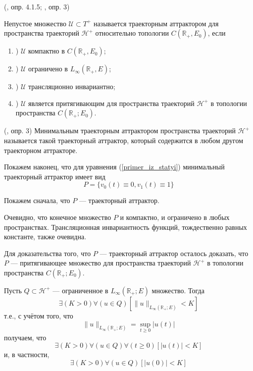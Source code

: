 \opred (\cite{Zelenaya}, опр. 4.1.5; \cite{zhidkosti_s_pamyatyu}, опр. 3)

Непустое множество $\mathcal{U}\subset T^+$
называется траекторным аттрактором для пространства траекторий $\mathcal{H}^+$
относительно топологии $C(\mathbb{R}_+,E_0)$, если
\begin{enumerate}
	\item)
		$\mathcal{U}$ компактно в $C(\mathbb{R}_+,E_0)$;
	\item)
		$\mathcal{U}$ ограничено в $L_{\infty}(\mathbb{R}_+,E)$;
	\item)
		$\mathcal{U}$ трансляционно инвариантно;
	\item)
		$\mathcal{U}$ является притягивающим для пространства траекторий $\mathcal{H}^+$
		в топологии пространства $C(\mathbb{R}_+; E_0)$.
\end{enumerate}

\opred (\cite{zhidkosti_s_pamyatyu}, опр. 3)
Минимальным траекторным аттрактором пространства траекторий $\mathcal{H}^+$
называется такой траекторный аттрактор, который содержится в любом другом траекторном аттракторе.


Покажем наконец, что для уравнения (\ref{primer_iz_statyi}) минимальный траекторный аттрактор имеет вид
\begin{equation}
	P = \{ v_0(t) \equiv 0, v_1(t) \equiv 1\}
\end{equation}

Покажем сначала, что $P$ --- траекторный аттрактор.

Очевидно, что конечное множество $P$ и компактно, и ограничено в любых пространствах.
Трансляционная инвариантность функций, тождественно равных константе, также очевидна.

Для доказательства того, что $P$ --- траекторный аттрактор осталось доказать,
что $P$ --- притягивающее множество для пространства траекторий $\mathcal{H}^+$ в топологии пространства $C(\mathbb{R}_+; E_0)$.

Пусть $Q \subset \mathcal{H}^+$ --- ограниченное в $L_{\infty}(\mathbb{R}_+;E)$ множество.
Тогда
\begin{equation}
	\exists(K>0)\forall(u\in Q)\left[ \| u \|_{L_{\infty}(\mathbb{R}_+;E)} < K\right]
\end{equation}
т.е., с учётом того, что
$$
	\| u \|_{L_{\infty}(\mathbb{R}_+;E)} = \sup_{t\geq 0}|u(t)|
$$
получаем, что
\begin{equation}
	\exists(K>0)\forall(u\in Q)\forall(t \geq 0)\left[ | u (t) | < K\right]
\end{equation}
и, в частности,
\begin{equation}
	\exists(K>0)\forall(u\in Q)\left[ | u (0) | < K\right]
\end{equation}

